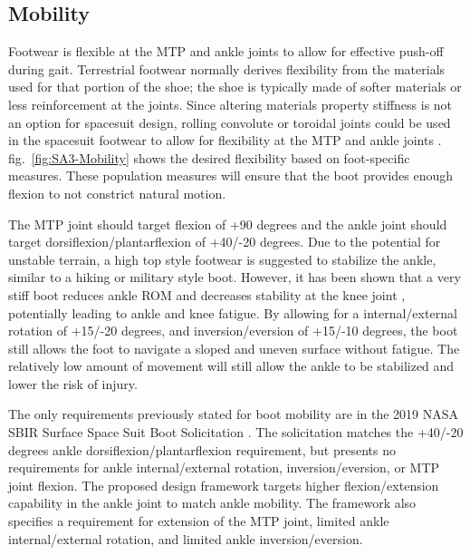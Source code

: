 \documentclass[defaultstyle,11pt]{thesis}
\begin{document}
\hypertarget{mobility}{%
\subsection{Mobility}\label{mobility}}

Footwear is flexible at the MTP and ankle joints to allow for effective push-off during gait. Terrestrial footwear normally derives flexibility from the materials used for that portion of the shoe; the shoe is typically made of softer materials or less reinforcement at the joints. Since altering materials property stiffness is not an option for spacesuit design, rolling convolute or toroidal joints could be used in the spacesuit footwear to allow for flexibility at the MTP and ankle joints \citep{Harris2001}. fig.~\ref{fig:SA3-Mobility} shows the desired flexibility based on foot-specific measures. These population measures will ensure that the boot provides enough flexion to not constrict natural motion.

The MTP joint should target flexion of +90 degrees and the ankle joint should target dorsiflexion/plantarflexion of +40/-20 degrees.
Due to the potential for unstable terrain, a high top style footwear is suggested to stabilize the ankle, similar to a hiking or military style boot.
However, it has been shown that a very stiff boot reduces ankle ROM and decreases stability at the knee joint \citep{Bohm2010}, potentially leading to ankle and knee fatigue.
By allowing for a internal/external rotation of +15/-20 degrees, and inversion/eversion of +15/-10 degrees, the boot still allows the foot to navigate a sloped and uneven surface without fatigue.
The relatively low amount of movement will still allow the ankle to be stabilized and lower the risk of injury.

The only requirements previously stated for boot mobility are in the 2019 NASA SBIR Surface Space Suit Boot Solicitation \citep{NASA2019}.
The solicitation matches the +40/-20 degrees ankle dorsiflexion/plantarflexion requirement, but presents no requirements for ankle internal/external rotation, inversion/eversion, or MTP joint flexion.
The proposed design framework targets higher flexion/extension capability in the ankle joint to match ankle mobility.
The framework also specifies a requirement for extension of the MTP joint, limited ankle internal/external rotation, and limited ankle inversion/eversion.
\end{document}
